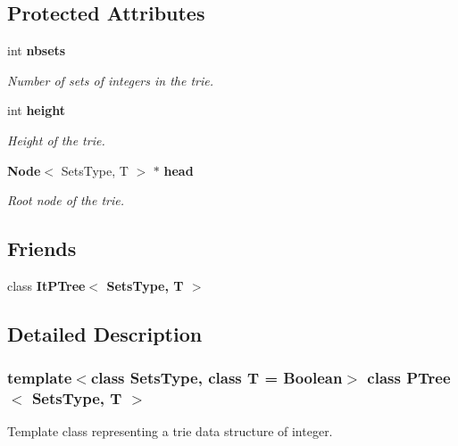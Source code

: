 \subsection*{Protected Attributes}
\begin{CompactItemize}
\item 
int {\bf nbsets}\label{class_p_tree_0e7cd51500557bb0269d221bd9ffc88e}

\begin{CompactList}\small\item\em Number of sets of integers in the trie. \item\end{CompactList}\item 
int {\bf height}\label{class_p_tree_11613cc6da516052c27239b78dacdc5c}

\begin{CompactList}\small\item\em Height of the trie. \item\end{CompactList}\item 
{\bf Node}$<$ Sets\-Type, T $>$ $\ast$ {\bf head}\label{class_p_tree_3761bcbfb42d1376697cc315de0d19ed}

\begin{CompactList}\small\item\em Root node of the trie. \item\end{CompactList}\end{CompactItemize}
\subsection*{Friends}
\begin{CompactItemize}
\item 
class {\bf It\-PTree$<$ Sets\-Type, T $>$}\label{class_p_tree_903af7ba64521b8f0bd0df111679c5ea}

\end{CompactItemize}


\subsection{Detailed Description}
\subsubsection*{template$<$class Sets\-Type, class T = Boolean$>$ class PTree$<$ Sets\-Type, T $>$}

Template class representing a trie data structure of integer. 

